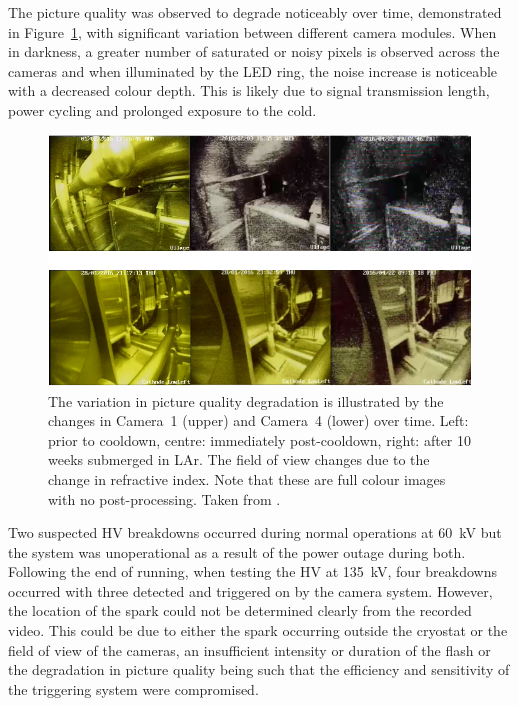 The picture quality was observed to degrade noticeably over time, demonstrated in Figure~\ref{fig:35tonCamerasDegredation}, with significant variation between different camera modules.  When in darkness, a greater number of saturated or noisy pixels is observed across the cameras and when illuminated by the LED ring, the noise increase is noticeable with a decreased colour depth.  This is likely due to signal transmission length, power cycling and prolonged exposure to the cold.

\begin{figure}
  \centering
  \includegraphics[width=12cm]{35tonCamerasDegredation.pdf}
  \caption[The variation in picture quality degradation in the 35~ton camera system is illustrated by the changes in Camera~1 and Camera~4 over time.]{The variation in picture quality degradation is illustrated by the changes in Camera~1 (upper) and Camera~4 (lower) over time. Left: prior to cooldown, centre: immediately post-cooldown, right: after 10 weeks submerged in LAr.  The field of view changes due to the change in refractive index.  Note that these are full colour images with no post-processing.  Taken from \cite{35tonCameras2017}.}
  \label{fig:35tonCamerasDegredation}
\end{figure}

Two suspected HV breakdowns occurred during normal operations at 60~kV but the system was unoperational as a result of the power outage during both.  Following the end of running, when testing the HV at 135~kV, four breakdowns occurred with three detected and triggered on by the camera system.  However, the location of the spark could not be determined clearly from the recorded video. This could be due to either the spark occurring outside the cryostat or the field of view of the cameras, an insufficient intensity or duration of the flash or the degradation in picture quality being such that the efficiency and sensitivity of the triggering system were compromised.

